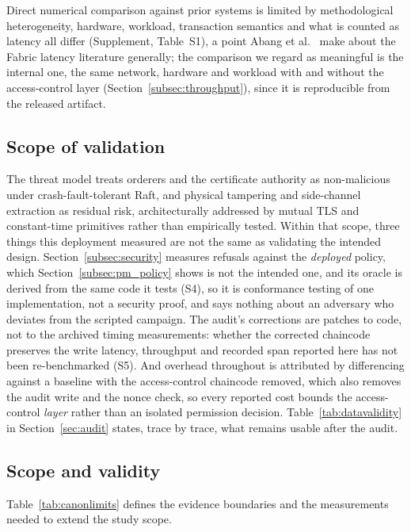 \documentclass[a4paper,fleqn]{cas-dc}
\begin{document}
Direct numerical comparison against prior systems is limited by
methodological heterogeneity, hardware, workload, transaction semantics
and what is counted as latency all differ (Supplement, Table~S1), a point
Abang et al.~\cite{abang2024latency} make about the Fabric latency
literature generally; the comparison we regard as meaningful is the
internal one, the same network, hardware and workload with and without
the access-control layer (Section~\ref{subsec:throughput}), since it is
reproducible from the released artifact.

\subsection{Scope of validation}
\label{subsec:notvalidated}

The threat model treats orderers and the certificate authority as
non-malicious under crash-fault-tolerant Raft, and physical tampering and
side-channel extraction as residual risk, architecturally addressed by
mutual TLS and constant-time primitives rather than empirically tested.
Within that scope, three things this deployment measured are not the same
as validating the intended design. Section~\ref{subsec:security} measures
refusals against the \emph{deployed} policy, which
Section~\ref{subsec:pm_policy} shows is not the intended one, and its
oracle is derived from the same code it tests (S4), so it is conformance
testing of one implementation, not a security proof, and says nothing
about an adversary who deviates from the scripted campaign. The
audit's corrections are patches to code, not to the archived timing
measurements: whether the corrected chaincode preserves the write latency,
throughput and recorded span reported here has not been re-benchmarked
(S5). And overhead throughout is attributed by differencing against a
baseline with the access-control chaincode removed, which also removes the
audit write and the nonce check, so every reported cost bounds the
access-control \emph{layer} rather than an isolated permission decision.
Table~\ref{tab:datavalidity} in Section~\ref{sec:audit} states, trace
by trace, what remains usable after the audit.

\subsection{Scope and validity}
\label{subsec:limits}
\label{subsec:threats}

Table~\ref{tab:canonlimits} defines the evidence boundaries and the
measurements needed to extend the study scope.
\end{document}
